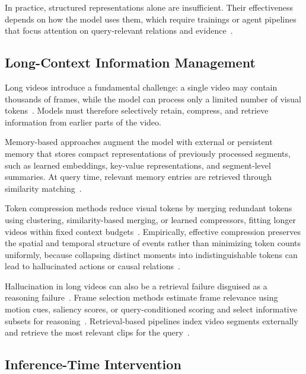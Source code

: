 \documentclass[10pt]{article} %
\begin{document}
In practice, structured representations alone are insufficient. Their effectiveness depends on how the model uses them, which require trainings or agent pipelines that focus attention on query-relevant relations and evidence~\citep{Malik2025RAVURA}.

\subsection{Long-Context Information Management}

Long videos introduce a fundamental challenge: a single video may contain thousands of frames, while the model can process only a limited number of visual tokens~\citep{Xu2025EVRAGEL}. Models must therefore selectively retain, compress, and retrieve information from earlier parts of the video.

Memory-based approaches augment the model with external or persistent memory that stores compact representations of previously processed segments, such as learned embeddings, key-value representations, and segment-level summaries. At query time, relevant memory entries are retrieved through similarity matching~\citep{Song2023MovieChatFD, Jin2025VideoMemEU}.

Token compression methods reduce visual tokens by merging redundant tokens using clustering, similarity-based merging, or learned compressors, fitting longer videos within fixed context budgets~\citep{Weng2024LongVLMEL, Guo2025FiLAVideoSC}. Empirically, effective compression preserves the spatial and temporal structure of events rather than minimizing token counts uniformly, because collapsing distinct moments into indistinguishable tokens can lead to hallucinated actions or causal relations~\citep{Sun2025LLaVAScissorTC}.

Hallucination in long videos can also be a retrieval failure disguised as a reasoning failure~\citep{yu2026longvidsearch}. Frame selection methods estimate frame relevance using motion cues, saliency scores, or query-conditioned scoring and select informative subsets for reasoning~\citep{Tang2025AdaptiveKS, Guo2025LogicinFramesDK}. Retrieval-based pipelines index video segments externally and retrieve the most relevant clips for the query~\citep{Ataallah2024GoldfishVU, Yuan2025MemoryenhancedRA}.

\subsection{Inference-Time Intervention}
\end{document}
